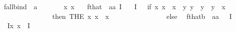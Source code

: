 \begin{isabellebody}
\isamarkupfalse%
\ f{\isacharunderscore}all{\isacharunderscore}bind\ {\isacharcolon}{\isacharcolon}\ {\isachardoublequoteopen}{\isacharparenleft}{\isacharprime}a{\isasymRightarrow}{\isasymsigma}{\isacharparenright}{\isasymRightarrow}{\isasymsigma}{\isachardoublequoteclose}\ {\isacharparenleft}\ {\isachardoublequoteopen}\isactrlbold {\isasymforall}{\isachardoublequoteclose}\ {\isacharbrackleft}{}{\isacharbrackright}\ {}{\isacharparenright}\ \isanewline
\ \ {\isachardoublequoteopen}\isactrlbold {\isasymforall}x{\isachardot}\ {\isasymphi}{\isacharparenleft}x{\isacharparenright}\ {\isasymequiv}\ \isactrlbold {\isasymforall}{\isasymphi}{\isachardoublequoteclose}\isanewline
{}\isamarkupfalse%
\ f{\isacharunderscore}that\ {\isacharcolon}{\isacharcolon}\ {\isachardoublequoteopen}{\isacharparenleft}{\isacharprime}a{\isasymRightarrow}{\isasymsigma}{\isacharparenright}{\isasymRightarrow}{\isacharprime}a{\isachardoublequoteclose}\ {\isacharparenleft}{\isachardoublequoteopen}\isactrlbold I{\isachardoublequoteclose}{\isacharparenright}\ \isanewline
\ \ {\isachardoublequoteopen}\isactrlbold I\ {\isasymPhi}\ {\isasymequiv}\ if\ {\isasymexists}x{\isachardot}\ {\isasymA}{\isacharparenleft}x{\isacharparenright}\ {\isasymand}\ {\isasymPhi}{\isacharparenleft}x{\isacharparenright}\ {\isasymand}\ {\isacharparenleft}{\isasymforall}y{\isachardot}\ {\isacharparenleft}{\isasymA}{\isacharparenleft}y{\isacharparenright}\ {\isasymand}\ {\isasymPhi}{\isacharparenleft}y{\isacharparenright}{\isacharparenright}\ {\isasymlongrightarrow}\ {\isacharparenleft}y\ {\isacharequal}\ x{\isacharparenright}{\isacharparenright}\ \isanewline
\ \ \ \ \ \ \ \ \ \ \ \ \ \ \ then\ THE\ x{\isachardot}\ {\isasymA}{\isacharparenleft}x{\isacharparenright}\ {\isasymand}\ {\isasymPhi}{\isacharparenleft}x{\isacharparenright}\ \isanewline
\ \ \ \ \ \ \ \ \ \ \ \ \ \ \ else\ \isactrlbold {\isasymstar}{\isachardoublequoteclose}\isanewline
{}\isamarkupfalse%
\ f{\isacharunderscore}that{\isacharunderscore}b\ {\isacharcolon}{\isacharcolon}\ {\isachardoublequoteopen}{\isacharparenleft}{\isacharprime}a{\isasymRightarrow}{\isasymsigma}{\isacharparenright}{\isasymRightarrow}{\isacharprime}a{\isachardoublequoteclose}\ \ {\isacharparenleft}\ {\isachardoublequoteopen}\isactrlbold I{\isachardoublequoteclose}\ {\isacharbrackleft}{}{\isacharbrackright}\ {}{\isacharparenright}\ \isanewline
\ \ {\isachardoublequoteopen}\isactrlbold Ix{\isachardot}\ {\isasymphi}{\isacharparenleft}x{\isacharparenright}\ {\isasymequiv}\ \isactrlbold I{\isacharparenleft}{\isasymphi}{\isacharparenright}{\isachardoublequoteclose}\isanewline

\end{isabellebody}
